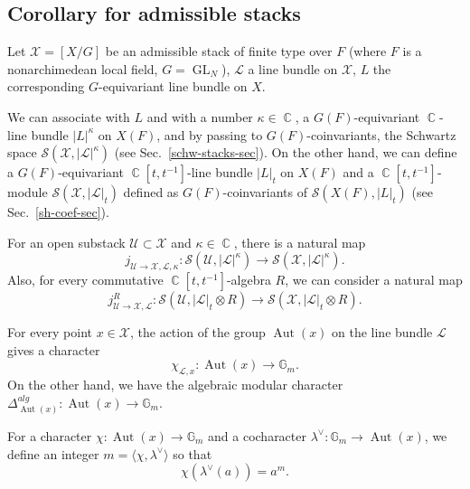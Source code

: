 \documentclass[12pt,reqno]{amsart}
\DeclareMathOperator\C{\mathbb C}
\theoremstyle{definition}
\theoremstyle{remark}
\newtheorem{remark}[theorem]{Remark}
\numberwithin{equation}{section}
\newcommand{\De}{\Delta}
\newcommand{\Aut}{\operatorname{Aut}}
\newcommand{\hra}{\hookrightarrow}
\newcommand{\ot}{\otimes}
\renewcommand{\SS}{{\mathcal S}}
\newcommand{\LL}{{\mathcal L}}
\newcommand{\UU}{{\mathcal U}}
\newcommand{\sub}{\subset}
\newcommand{\la}{\lambda}
\newcommand{\GL}{\operatorname{GL}}
\newcommand{\G}{{\mathbb G}}
\newcommand{\lan}{\langle}
\newcommand{\ran}{\rangle}
\newcommand{\XX}{{\mathcal X}}
\begin{document}

\subsection{Corollary for admissible stacks}

Let $\XX=[X/G]$ be an admissible stack of finite type over $F$ (where $F$ is a nonarchimedean local field, $G=\GL_N$),  $\LL$ a line bundle on $\XX$, $L$ the corresponding
$G$-equivariant line bundle on $X$.

We can associate with $L$ and with a number $\kappa\in\C$, a $G(F)$-equivariant $\C$-line bundle $|L|^{\kappa}$ on $X(F)$, and by passing to $G(F)$-coinvariants, the Schwartz
space $\SS(\XX,|\LL|^{\kappa})$ (see Sec.\ \ref{schw-stacks-sec}). On the other hand, we can define a $G(F)$-equivariant $\C[t,t^{-1}]$-line bundle $|L|_t$ on $X(F)$ and a $\C[t,t^{-1}]$-module
$\SS(\XX,|\LL|_t)$ defined as $G(F)$-coinvariants of $\SS(X(F),|L|_t)$ (see Sec.\ \ref{sh-coef-sec}). 

For an open substack $\UU\sub\XX$ and $\kappa\in\C$, there is a natural map
$$j_{\UU\to \XX,\LL,\kappa}:\SS(\UU,|\LL|^{\kappa})\to \SS(\XX,|\LL|^{\kappa}).$$
Also, for every commutative $\C[t,t^{-1}]$-algebra $R$, we can consider a natural map
$$j^R_{\UU\to \XX,\LL}:\SS(\UU,|\LL|_t\ot R)\to \SS(\XX,|\LL|_t\ot R).$$

For every point $x\in \XX$, the action of the group $\Aut(x)$ on the line bundle $\LL$ gives a character
$$\chi_{\LL,x}:\Aut(x)\to \G_m.$$
On the other hand, we have the algebraic modular character $\De^{alg}_{\Aut(x)}:\Aut(x)\to \G_m$.

For a character $\chi:\Aut(x)\to \G_m$ and a cocharacter $\la^\vee:\G_m\to \Aut(x)$, we define an integer $m=\lan\chi,\la^\vee\ran$ so that
$$\chi(\la^\vee(a))=a^m.$$
\end{document}
